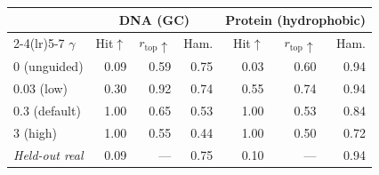 \begin{tabular}{lrrrrrr}
\toprule
& \multicolumn{3}{c}{DNA (GC)} & \multicolumn{3}{c}{Protein (hydrophobic)} \\
\cmidrule(lr){2-4}\cmidrule(lr){5-7}
$\gamma$ & Hit$\uparrow$ & $r_{\text{top}}\uparrow$ & Ham. & Hit$\uparrow$ & $r_{\text{top}}\uparrow$ & Ham. \\
\midrule
0 (unguided) & 0.09 & 0.59 & 0.75 & 0.03 & 0.60 & 0.94 \\
0.03 (low) & 0.30 & 0.92 & 0.74 & 0.55 & 0.74 & 0.94 \\
0.3 (default) & 1.00 & 0.65 & 0.53 & 1.00 & 0.53 & 0.84 \\
3 (high) & 1.00 & 0.55 & 0.44 & 1.00 & 0.50 & 0.72 \\
\midrule
\emph{Held-out real} & 0.09 & --- & 0.75 & 0.10 & --- & 0.94 \\
\bottomrule
\end{tabular}